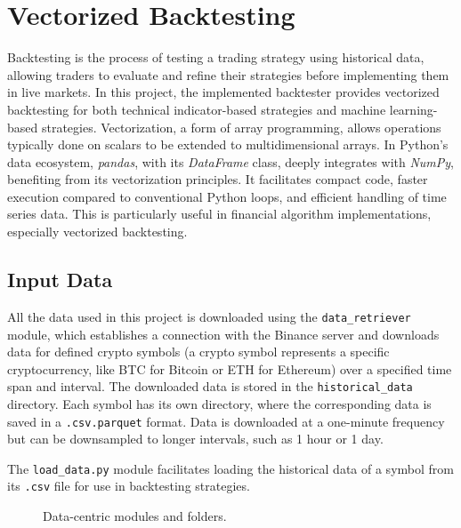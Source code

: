 \chapter{Vectorized Backtesting}


Backtesting is the process of testing a trading strategy using historical data, allowing traders to evaluate and refine their
strategies before implementing them in live markets.
In this project, the implemented backtester provides vectorized backtesting for both technical indicator-based strategies
and machine learning-based strategies.
Vectorization, a form of array programming, allows operations typically done on scalars to be extended to multidimensional arrays.
In Python's data ecosystem, \textit{pandas}, with its \textit{DataFrame} class, deeply integrates with \textit{NumPy}, benefiting from
its vectorization principles.
It facilitates compact code, faster execution compared to conventional Python loops, and efficient handling of time series data.
This is particularly useful in financial algorithm implementations, especially vectorized backtesting.

\section{Input Data}


All the data used in this project is downloaded using the \texttt{data\_retriever} module, which establishes a connection with the Binance server
 and downloads data for defined crypto symbols (a crypto symbol represents a specific cryptocurrency,
like BTC for Bitcoin or ETH for Ethereum) over a specified time span and interval.
The downloaded data is stored in the \texttt{historical\_data} directory. Each symbol has its own directory, where the corresponding data is
saved in a \texttt{.csv.parquet} format.
Data is downloaded at a one-minute frequency but can be downsampled to longer intervals, such as 1 hour or 1 day.

The \texttt{load\_data.py} module facilitates loading the historical data of a symbol from its \texttt{.csv} file for use in backtesting strategies.

\begin{figure}[h]

\caption{Data-centric modules and folders.}\label{fig:inputdata}
\end{figure}

